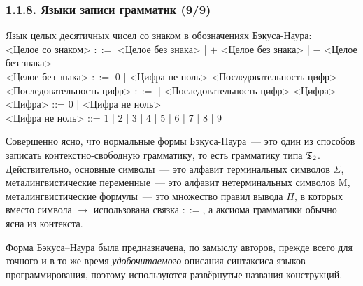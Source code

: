 \begin{frame}
\frametitle{1.1.8. Языки записи грамматик (9/9)}


\begin{example}
Язык целых десятичных чисел со знаком в обозначениях Бэкуса-Наура:\\
<Целое со знаком> $::=$ <Целое без знака> | $+$ <Целое без знака> |
$-$ <Целое без знака> \\
<Целое без знака> $::=$ 0 | <Цифра не ноль> <Последовательность цифр>\\
<Последовательность цифр> $::=$ | <Последовательность цифр> <Цифра>\\
<Цифра> ::= 0 | <Цифра не ноль> \\
<Цифра не ноль> ::=  1 | 2 | 3 | 4 | 5 | 6 | 7 | 8 | 9
\end{example}


Совершенно ясно, что нормальные формы Бэкуса-Наура~--- это один из
способов записать контекстно-свободную грамматику, 
то есть грамматику типа $\frak{T}_2$.  Действительно, основные
символы~--- это алфавит терминальных символов $\Sigma$,
металингвистические переменные~--- это алфавит нетерминальных
символов $\mathrm{M}$, 
металингвистические формулы~--- это множество правил
вывода $\Pi$, в которых вместо символа $\to$
использована связка $::=$, а аксиома грамматики обычно ясна из контекста.

\begin{remark}
Форма Бэкуса--Наура
была предназначена, по замыслу авторов,
прежде всего
для точного и в то же время
{\em удобочитаемого}
описания синтаксиса
языков программирования,
поэтому используются развёрнутые названия конструкций.
\end{remark}
\end{frame}

